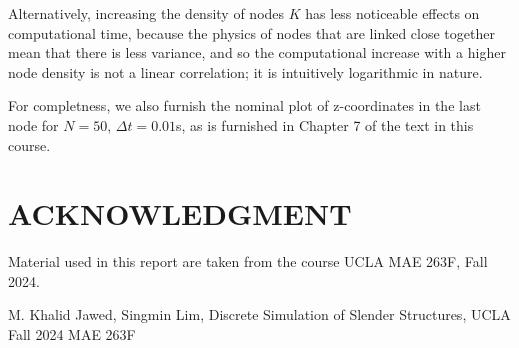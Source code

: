 \documentclass[letterpaper, 10 pt, conference]{ieeeconf}  %
\begin{document}
Alternatively, increasing the density of nodes $K$ has less noticeable effects on computational time, because the physics of nodes that are linked close together mean that there is less variance, and so the computational increase with a higher node density is not a linear correlation; it is intuitively logarithmic in nature.


For completness, we also furnish the nominal plot of z-coordinates in the last node for $N=50$, $\Delta t = 0.01$s, as is furnished in Chapter 7 of the text in this course.

\section*{ACKNOWLEDGMENT}

Material used in this report are taken from the course UCLA MAE 263F, Fall 2024.




\begin{thebibliography}{99}

 M. Khalid Jawed, Singmin Lim, Discrete Simulation of Slender Structures, UCLA Fall 2024 MAE 263F

\end{thebibliography}
\end{document}
